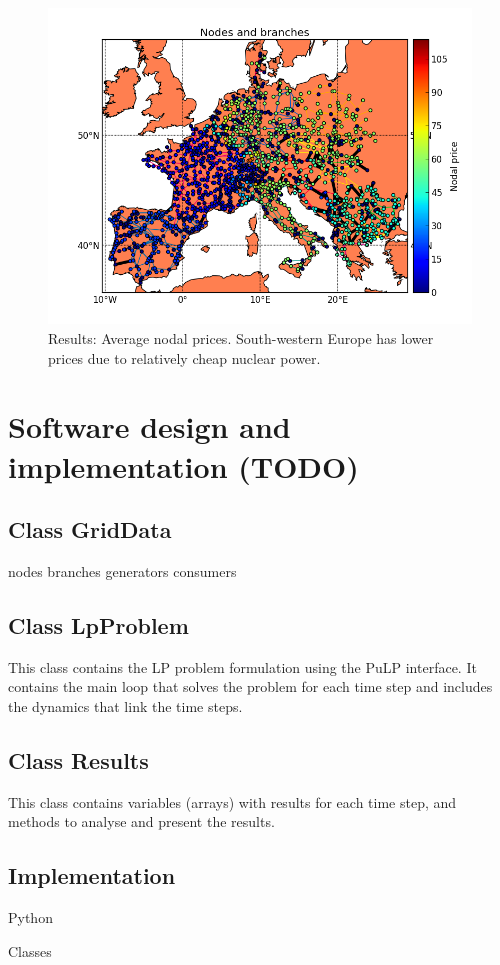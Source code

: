 \documentclass{article}
\begin{document}
\begin{figure}
\centering
\includegraphics[scale=0.6]{example_2w_map_nodalprices.png}
\caption{Results: Average nodal prices. South-western Europe has lower prices due to relatively cheap nuclear power. }
\label{fig:example_map_prices}
\end{figure}



\newpage
\appendix

\section{Software design and implementation (TODO)}

\subsection{Class GridData}
nodes
branches
generators
consumers

\subsection{Class LpProblem}
This class contains the LP problem formulation using the PuLP interface. It contains the main loop that solves the problem for each time step and includes the dynamics that link the time steps.


\subsection{Class Results}
This class contains variables (arrays) with results for each time step, and methods to analyse and present the results.


\subsection{Implementation}
Python

Classes




%
%

\end{document}
